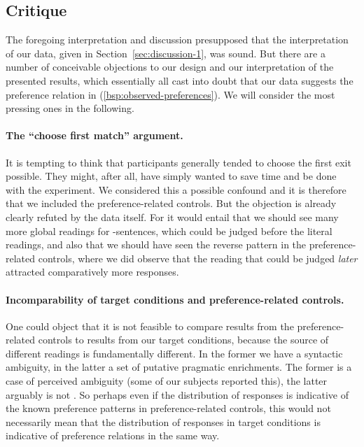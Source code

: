 \documentclass[fleqn,reqno,10pt]{article}
\renewcommand{\es}{\acro{es}}
\begin{document}
\subsection{Critique}

The foregoing interpretation and discussion presupposed that the
interpretation of our data, given in Section~\ref{sec:discussion-1},
was sound. But there are a number of conceivable objections to our
design and our interpretation of the presented results, which
essentially all cast into doubt that our data suggests the preference
relation in (\ref{bsp:observed-preferences}). We will consider the
most pressing ones in the following.

\paragraph{The ``choose first match'' argument.} It is tempting to
think that participants generally tended to choose the first exit
possible. They might, after all, have simply wanted to save time and
be done with the experiment. We considered this a possible confound
and it is therefore that we included the preference-related
controls. But the objection is already clearly refuted by the data
itself. For it would entail that we should see many more global
readings for \es-sentences, which could be judged before the literal
readings, and also that we should have seen the reverse pattern in the
preference-related controls, where we did observe that the reading
that could be judged \emph{later} attracted comparatively more
responses. 

\paragraph{Incomparability of target conditions and preference-related
  controls.} One could object that it is not feasible to compare
results from the preference-related controls to results from our
target conditions, because the source of different readings is
fundamentally different. In the former we have a syntactic ambiguity,
in the latter a set of putative pragmatic enrichments. The former is a
case of perceived ambiguity (some of our subjects reported this), the
latter arguably is not
\citep[see][]{GeurtsPouscoulous2009:Embedded-Implic}. So perhaps even
if the distribution of responses is indicative of the known preference
patterns in preference-related controls, this would not necessarily
mean that the distribution of responses in target conditions is
indicative of preference relations in the same way.
\end{document}
